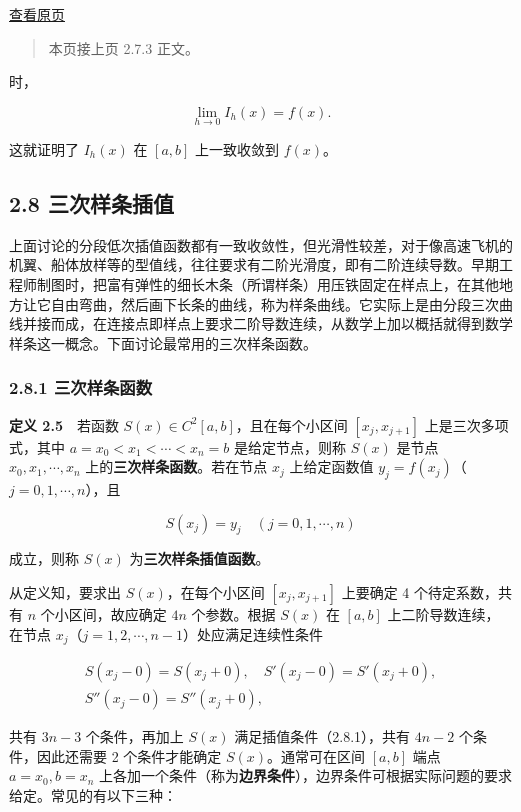 \documentclass[
  10pt,
  fontset=fandol]{ctexart}
\begin{document}
\href{../../source-images/pdf-049.jpeg}{查看原页}

\begin{quote}
本页接上页 2.7.3 正文。
\end{quote}

时，

\[\lim_{h\to0}I_h(x)=f(x).\]

这就证明了 \(I_h(x)\) 在 \([a,b]\) 上一致收敛到 \(f(x)\)。

\subsection{2.8 三次样条插值}\label{ux4e09ux6b21ux6837ux6761ux63d2ux503c}

上面讨论的分段低次插值函数都有一致收敛性，但光滑性较差，对于像高速飞机的机翼、船体放样等的型值线，往往要求有二阶光滑度，即有二阶连续导数。早期工程师制图时，把富有弹性的细长木条（所谓样条）用压铁固定在样点上，在其他地方让它自由弯曲，然后画下长条的曲线，称为样条曲线。它实际上是由分段三次曲线并接而成，在连接点即样点上要求二阶导数连续，从数学上加以概括就得到数学样条这一概念。下面讨论最常用的三次样条函数。

\subsubsection{2.8.1 三次样条函数}\label{ux4e09ux6b21ux6837ux6761ux51fdux6570}

\textbf{定义 2.5}　若函数 \(S(x)\in C^2[a,b]\)，且在每个小区间 \([x_j,x_{j+1}]\) 上是三次多项式，其中 \(a=x_0<x_1<\cdots<x_n=b\) 是给定节点，则称 \(S(x)\) 是节点 \(x_0,x_1,\cdots,x_n\) 上的\textbf{三次样条函数}。若在节点 \(x_j\) 上给定函数值 \(y_j=f(x_j)\)（\(j=0,1,\cdots,n\)），且

\[S(x_j)=y_j\quad(j=0,1,\cdots,n)\tag{2.8.1}\]

成立，则称 \(S(x)\) 为\textbf{三次样条插值函数}。

从定义知，要求出 \(S(x)\)，在每个小区间 \([x_j,x_{j+1}]\) 上要确定 4 个待定系数，共有 \(n\) 个小区间，故应确定 \(4n\) 个参数。根据 \(S(x)\) 在 \([a,b]\) 上二阶导数连续，在节点 \(x_j\)（\(j=1,2,\cdots,n-1\)）处应满足连续性条件

\[\begin{gathered}
S(x_j-0)=S(x_j+0),\quad S'(x_j-0)=S'(x_j+0),\\
S''(x_j-0)=S''(x_j+0),
\end{gathered}\tag{2.8.2}\]

共有 \(3n-3\) 个条件，再加上 \(S(x)\) 满足插值条件（2.8.1），共有 \(4n-2\) 个条件，因此还需要 2 个条件才能确定 \(S(x)\)。通常可在区间 \([a,b]\) 端点 \(a=x_0,b=x_n\) 上各加一个条件（称为\textbf{边界条件}），边界条件可根据实际问题的要求给定。常见的有以下三种：
\end{document}
